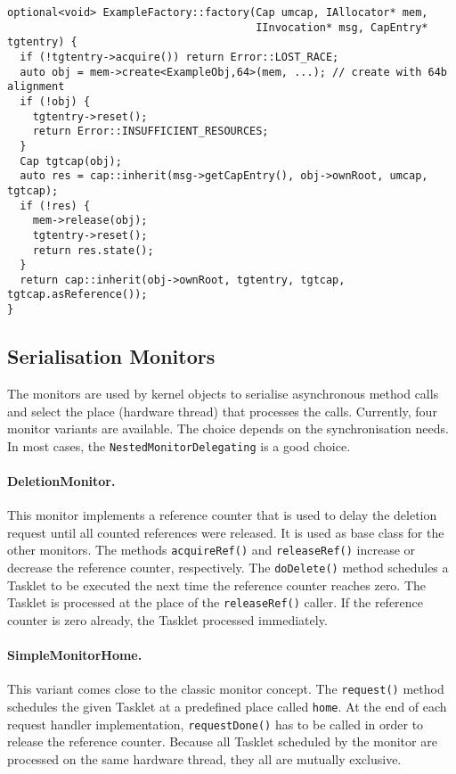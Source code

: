\begin{lstlisting}[float, label=lst:factory, caption=An example factory implementation.]
optional<void> ExampleFactory::factory(Cap umcap, IAllocator* mem,
                                       IInvocation* msg, CapEntry* tgtentry) {
  if (!tgtentry->acquire()) return Error::LOST_RACE;
  auto obj = mem->create<ExampleObj,64>(mem, ...); // create with 64b alignment
  if (!obj) {
    tgtentry->reset();
    return Error::INSUFFICIENT_RESOURCES;
  }
  Cap tgtcap(obj);
  auto res = cap::inherit(msg->getCapEntry(), obj->ownRoot, umcap, tgtcap);
  if (!res) {
    mem->release(obj);
    tgtentry->reset();
    return res.state();
  }
  return cap::inherit(obj->ownRoot, tgtentry, tgtcap, tgtcap.asReference());
}
\end{lstlisting}



\subsection{Serialisation Monitors}

The monitors are used by kernel objects to serialise asynchronous
method calls and select the place (hardware thread) that processes the
calls.  Currently, four monitor variants are available.  The choice
depends on the synchronisation needs.  In most cases, the
\texttt{NestedMonitorDelegating} is a good choice.

\paragraph{DeletionMonitor.}
This monitor implements a reference counter that is used to delay the
deletion request until all counted references were released.  It is
used as base class for the other monitors.  The methods
\texttt{acquireRef()} and \texttt{releaseRef()} increase or decrease
the reference counter, respectively.  The \texttt{doDelete()} method
schedules a Tasklet to be executed the next time the reference counter
reaches zero.  The Tasklet is processed at the place of the
\texttt{releaseRef()} caller.  If the reference counter is zero
already, the Tasklet processed immediately.

\paragraph{SimpleMonitorHome.}
This variant comes close to the classic monitor concept.  The
\texttt{request()} method schedules the given Tasklet at a predefined
place called \texttt{home}.  At the end of each request handler
implementation, \texttt{requestDone()} has to be called in order to
release the reference counter.  Because all Tasklet scheduled by the
monitor are processed on the same hardware thread, they all are
mutually exclusive.

